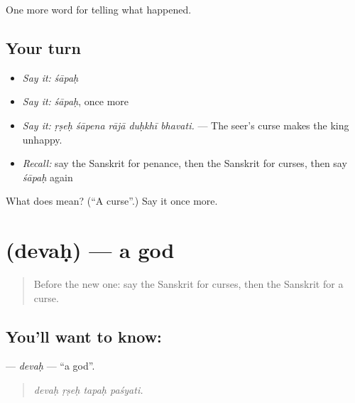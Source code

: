 \begin{grammarlens}[title={What you've built}]
One more word for telling what happened.
\end{grammarlens}

\subsection*{Your turn}
\begin{itemize}
\raggedright
  \item \emph{Say it:} \emph{śāpaḥ}
  \item \emph{Say it:} \emph{śāpaḥ}, once more
  \item \emph{Say it:} \emph{ṛṣeḥ śāpena rājā duḥkhī bhavati.} — The seer's curse makes the king unhappy.
  \item \emph{Recall:} say the Sanskrit for penance, then the Sanskrit for curses, then say \emph{śāpaḥ} again
\end{itemize}

\begin{tcolorbox}[breakable,colback=teal!4,colframe=teal!35!black,title={Before you move on}]
What does  mean? (\textquotedblleft{}A curse\textquotedblright{}.) Say it once more.
\end{tcolorbox}
\section[\texorpdfstring{\sk{देवः} (devaḥ)}{देवः (devaḥ)}]{ (devaḥ) — a god}

\label{lesson:SA-C333-devah}



\begin{quote}
Before the new one: say the Sanskrit for curses, then the Sanskrit for a curse.
\end{quote}

\subsection*{You'll want to know: }
\textbf{} — \emph{devaḥ} — \textquotedblleft{}a god\textquotedblright{}.

\begin{quote}
   
\end{quote}

\begin{quote}
\emph{devaḥ ṛṣeḥ tapaḥ paśyati.}
\end{quote}

